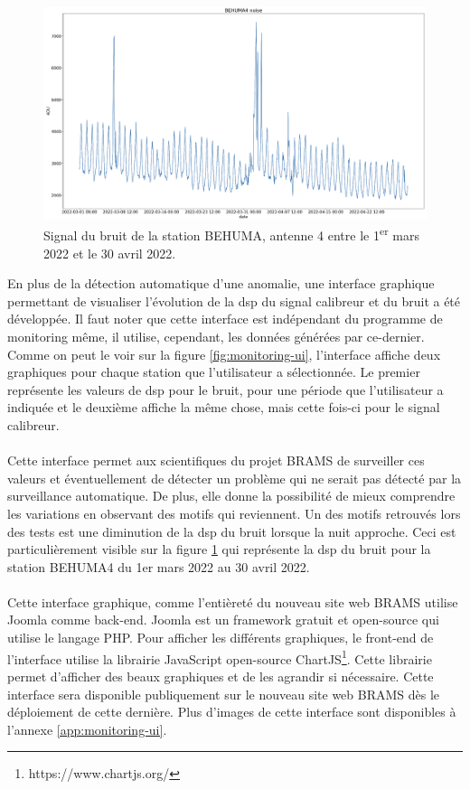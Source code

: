 \documentclass[11pt]{article}
\begin{document}
\begin{figure}[t]
    \begin{center}
        \includegraphics[scale=0.17]{BEHUMA4_2022-03-01_2022-04-30_noise.png}
        \caption{Signal du bruit de la station BEHUMA, antenne 4 entre le 1\textsuperscript{er} mars 2022 et le 30 avril 2022.}
        \label{fig:BEHUMA4-variations}
    \end{center}
\end{figure}

En plus de la détection automatique d'une anomalie, une interface graphique permettant de visualiser l'évolution de la dsp du signal calibreur et du bruit a été développée.
Il faut noter que cette interface est indépendant du programme de monitoring même, il utilise, cependant, les données générées par ce-dernier.
Comme on peut le voir sur la figure  \ref{fig:monitoring-ui}, l'interface affiche deux graphiques pour chaque station que l'utilisateur a sélectionnée.
Le premier représente les valeurs de dsp pour le bruit, pour une période que l'utilisateur a indiquée et le deuxième affiche la même chose, mais cette fois-ci pour le signal calibreur.\\
\\
Cette interface permet aux scientifiques du projet BRAMS de surveiller ces valeurs et éventuellement de détecter un problème qui ne serait pas détecté par la surveillance automatique.
De plus, elle donne la possibilité de mieux comprendre les variations en observant des motifs qui reviennent.
Un des motifs retrouvés lors des tests est une diminution de la dsp du bruit lorsque la nuit approche.
Ceci est particulièrement visible sur la figure \ref{fig:BEHUMA4-variations} qui représente la dsp du bruit pour la station BEHUMA4 du 1er mars 2022 au 30 avril 2022.\\
\\
Cette interface graphique, comme l'entièreté du nouveau site web BRAMS utilise Joomla comme back-end.
Joomla est un framework gratuit et open-source qui utilise le langage PHP.
Pour afficher les différents graphiques, le front-end de l'interface utilise la librairie JavaScript open-source ChartJS\footnote{https://www.chartjs.org/}.
Cette librairie permet d'afficher des beaux graphiques et de les agrandir si nécessaire.
Cette interface sera disponible publiquement sur le nouveau site web BRAMS dès le déploiement de cette dernière.
Plus d'images de cette interface sont disponibles à l'annexe \ref{app:monitoring-ui}.
\end{document}
